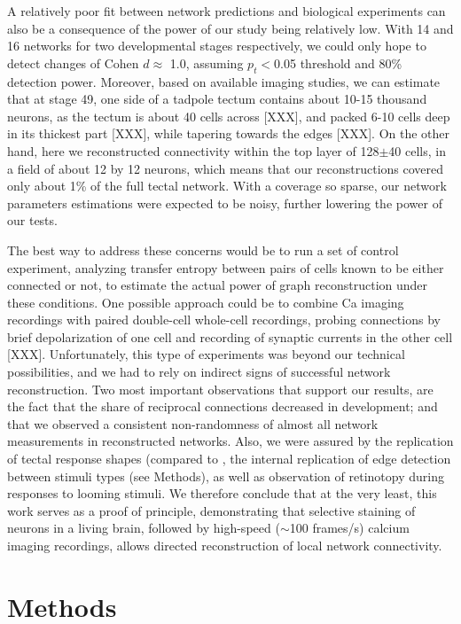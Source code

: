 \documentclass{article}
\begin{document}
A relatively poor fit between network predictions and biological experiments can also be a consequence of the power of our study being relatively low. With 14 and 16 networks for two developmental stages respectively, we could only hope to detect changes of Cohen $d \approx$ 1.0, assuming $p_t<$0.05 threshold and 80\% detection power. Moreover, based on available imaging studies, we can estimate that at stage 49, one side of a tadpole tectum contains about 10-15 thousand neurons, as the tectum is about 40 cells across [XXX], and packed 6-10 cells deep in its thickest part [XXX], while tapering towards the edges [XXX]. On the other hand, here we reconstructed connectivity within the top layer of 128$\pm$40 cells, in a field of about 12 by 12 neurons, which means that our reconstructions covered only about 1\% of the full tectal network. With a coverage so sparse, our network parameters estimations were expected to be noisy, further lowering the power of our tests.

The best way to address these concerns would be to run a set of control experiment, analyzing transfer entropy between pairs of cells known to be either connected or not, to estimate the actual power of graph reconstruction under these conditions. One possible approach could be to combine Ca imaging recordings with paired double-cell whole-cell recordings, probing connections by brief depolarization of one cell and recording of synaptic currents in the other cell [XXX]. Unfortunately, this type of experiments was beyond our technical possibilities, and we had to rely on indirect signs of successful network reconstruction. Two most important observations that support our results, are the fact that the share of reciprocal connections decreased in development; and that we observed a consistent non-randomness of almost all network measurements in reconstructed networks. Also, we were assured by the replication of tectal response shapes (compared to \citep{khakhalin2014}, the internal replication of edge detection between stimuli types (see Methods), as well as observation of retinotopy during responses to looming stimuli. We therefore conclude that at the very least, this work serves as a proof of principle, demonstrating that selective staining of neurons in a living brain, followed by high-speed ($\sim$100 frames/s) calcium imaging recordings, allows directed reconstruction of local network connectivity.

\section*{Methods}
\end{document}
